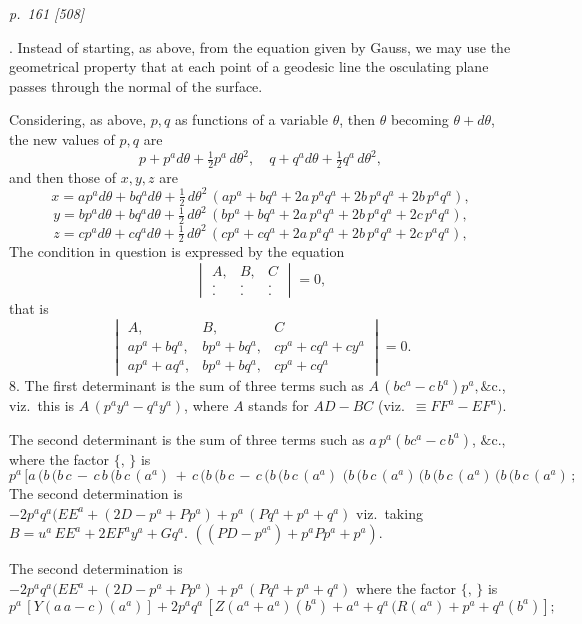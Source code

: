 \documentclass[11pt,a4paper]{book}
\begin{document}
\clearpage

\bigskip
\textit{p.~161 [508]}
\smallskip

. Instead of starting, as above, from the equation given by Gauss, we may use
the geometrical property that at each point of a geodesic line the osculating plane
passes through the normal of the surface.

Considering, as above, $p, q$ as functions of a variable $\theta$, then $\theta$ becoming $\theta + d\theta$,
the new values of $p, q$ are
\[
p + p^a d\theta + \tfrac{1}{2} p^a\,d\theta^2,\quad q + q^a d\theta + \tfrac{1}{2} q^a\,d\theta^2,
\]
and then those of $x, y, z$ are
\[
x = a p^a d\theta + b q^a d\theta + \tfrac{1}{2}\,d\theta^2\,(a p^a + b q^a + 2a\,p^a q^a + 2b\,p^a q^a + 2b\,p^a q^a),
\]
\[
y = b p^a d\theta + b q^a d\theta + \tfrac{1}{2}\,d\theta^2\,(b p^a + b q^a + 2a\,p^a q^a + 2b\,p^a q^a + 2c\,p^a q^a),
\]
\[
z = c p^a d\theta + c q^a d\theta + \tfrac{1}{2}\,d\theta^2\,(c p^a + c q^a + 2a\,p^a q^a + 2b\,p^a q^a + 2c\,p^a q^a),
\]
The condition in question is expressed by the equation
\[
\begin{vmatrix}
A, & B, & C\\
. & . & .\\
. & . & .
\end{vmatrix} = 0,
\]
that is
\[
\begin{vmatrix}
A, & B, & C\\
a p^a + b q^a, & b p^a + b q^a, & c p^a + c q^a + cy^a\\
a p^a + a q^a, & b p^a + b q^a, & c p^a + c q^a
\end{vmatrix} = 0.
\]
8. The first determinant is the sum of three terms such as $A\,(bc^a - c\,b^a) p^a, \&\text{c.}$,
viz.\ this is $A\,(p^a y^a - q^a y^a)$, where $A$ stands for $AD - BC$ (viz.\ $\equiv FF^a - EF^a)$.

The second determinant is the sum of three terms such as $a\,p^a (bc^a - c\,b^a)$, $\&\text{c.}$,
where the factor $\{,\,\}$ is
\[
p^a\,[a\,(b\,(b\,c\,-\,c\,b\,(b\,c\,(a^a)\,+\,c\,(b\,(b\,c\,-\,c\,(b\,(b\,c\,(a^a)\,\,(b\,(b\,c\,(a^a)\,(b\,(b\,c\,(a^a)\,(b\,(b\,c\,(a^a)\,;
\]
The second determination is $-2p^a q^a(EE^a + (2D - p^a + Pp^a) + p^a\,(Pq^a + p^a + q^a)$
viz.\ taking $B = u^a \,EE^a + 2EF^a y^a + Gq^a$. \quad $((PD - p^a^a) + p^a Pp^a + p^a)$.

The second determination is $-2p^a q^a(EE^a + (2D - p^a + Pp^a) + p^a\,(Pq^a + p^a + q^a)$
where the factor $\{,\,\}$ is
\[
p^a\,[Y(a\,a - c)(a^a)] + 2p^a q^a\,[Z(a^a + a^a)(b^a) + a^a + q^a\,(R(a^a) + p^a + q^a(b^a)];
\]
\end{document}
